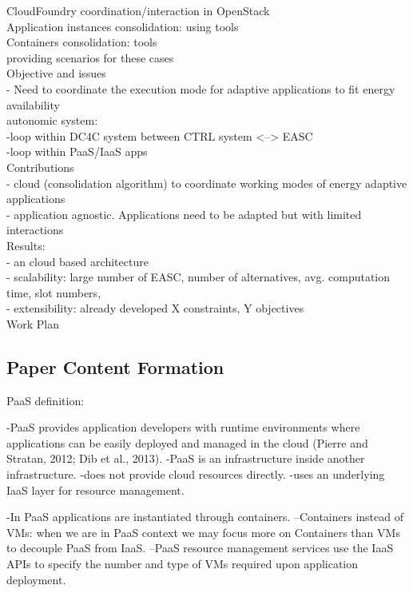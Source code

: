 CloudFoundry coordination/interaction in OpenStack \\
Application instances consolidation: using tools \\
Containers consolidation: tools \\


providing scenarios for these cases \\
Objective and issues \\
- Need to coordinate the execution mode for adaptive applications to fit energy availability \\
autonomic system: \\
-loop within DC4C system between CTRL system <--> EASC \\
-loop within PaaS/IaaS apps \\
		
Contributions \\
- cloud (consolidation algorithm) to coordinate working modes of energy adaptive applications \\
- application agnostic. Applications need to be adapted but with limited interactions \\
	
Results: \\
- an cloud based architecture \\
- scalability:  large number of EASC, number of alternatives, avg. computation time, slot numbers,  \\
- extensibility: already developed X constraints, Y objectives \\
 
Work Plan \\

\subsection{Paper Content Formation}
PaaS definition:

-PaaS provides application developers with runtime environments where applications can be easily deployed and managed in the cloud (Pierre and Stratan, 2012; Dib et al., 2013).
-PaaS is an infrastructure inside another infrastructure.
-does not provide cloud resources directly.
-uses an underlying IaaS layer for resource management.

-In PaaS applications are instantiated through containers.
--Containers instead of VMs: when we are in PaaS context we may focus more on Containers than VMs to decouple PaaS from IaaS.
--PaaS resource management services use the IaaS APIs to specify the number and type of VMs required upon application deployment.

